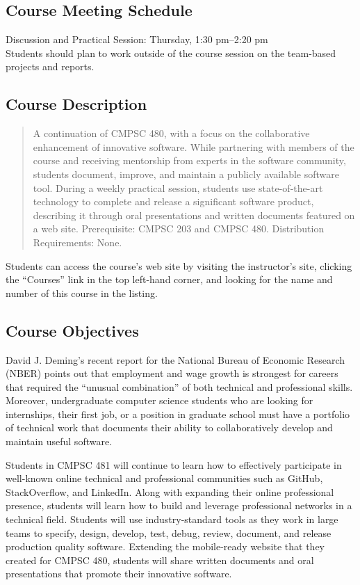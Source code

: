 \documentclass[11pt]{article}
\begin{document}
\subsection*{Course Meeting Schedule}

Discussion and Practical Session: Thursday, 1:30 pm--2:20 pm \\

\noindent Students should plan to work outside of the course session on the
team-based projects and reports.

\subsection*{Course Description}

\begin{quote}

A continuation of CMPSC 480, with a focus on the collaborative enhancement of
innovative software. While partnering with members of the course and receiving
mentorship from experts in the software community, students document, improve,
and maintain a publicly available software tool. During a weekly practical
session, students use state-of-the-art technology to complete and release a
significant software product, describing it through oral presentations and
written documents featured on a web site. Prerequisite: CMPSC 203 and CMPSC 480.
Distribution Requirements: None.

\end{quote}

\noindent Students can access the course's web site by visiting the instructor's
site, clicking the ``Courses'' link in the top left-hand corner, and looking for
the name and number of this course in the listing.

\subsection*{Course Objectives}

David J. Deming's recent report for the National Bureau of Economic Research
(NBER) points out that employment and wage growth is strongest for careers that
required the ``unusual combination'' of both technical and professional skills.
Moreover, undergraduate computer science students who are looking for
internships, their first job, or a position in graduate school must have a
portfolio of technical work that documents their ability to collaboratively
develop and maintain useful software.

Students in CMPSC 481 will continue to learn how to effectively participate in
well-known online technical and professional communities such as GitHub,
StackOverflow, and LinkedIn. Along with expanding their online professional
presence, students will learn how to build and leverage professional networks in
a technical field.
%
Students will use industry-standard tools as they work in large teams to
specify, design, develop, test, debug, review, document, and release production
quality software.
%
Extending the mobile-ready website that they created for CMPSC 480, students
will share written documents and oral presentations that promote their
innovative software.
\end{document}
